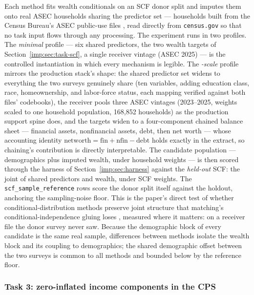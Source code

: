 Each method fits wealth conditionals on an SCF donor split and imputes them
onto real \cps{} ASEC households sharing the predictor set --- households
built from the Census Bureau's ASEC public-use files \citep{census2025}, read
directly from \texttt{census.gov} so that no task input flows through any
\policyengine{} processing. The experiment runs in two profiles. The
\emph{minimal} profile --- six shared predictors, the two wealth targets of
Section~\ref{imp:sec:task-scf}, a single receiver vintage (ASEC 2025) --- is the
controlled instantiation in which every mechanism is legible. The
\emph{\populace{}-scale} profile mirrors the production stack's shape: the
shared predictor set widens to everything the two surveys genuinely share
(ten variables, adding education class, race, homeownership, and labor-force
status, each mapping verified against both files' codebooks), the receiver
pools three ASEC vintages (2023--2025, weights scaled to one household
population, 168,852 households) as the production support spine does, and
the targets widen to a four-component chained balance sheet --- financial
assets, nonfinancial assets, debt, then net worth --- whose accounting
identity $\text{networth} = \text{fin} + \text{nfin} - \text{debt}$ holds
exactly in the extract, so chaining's contribution is directly
interpretable. The candidate population --- \cps{} demographics plus imputed wealth,
under \cps{} household weights --- is then scored through the harness of
Section~\ref{imp:sec:harness} against the \emph{held-out} SCF: the joint of
shared predictors and wealth, under SCF weights. The
\texttt{scf\_sample\_reference} rows score the donor split itself against the
holdout, anchoring the sampling-noise floor. This is the paper's direct test
of whether conditional-distribution methods preserve joint structure that
matching's conditional-independence gluing loses \citep{rassler2002statistical,
dorazio2006statistical}, measured where it matters: on a receiver file the
donor survey never saw. Because the demographic block of every candidate is
the same real \cps{} sample, differences between methods isolate the wealth
block and its coupling to demographics; the shared demographic offset between
the two surveys is common to all methods and bounded below by the reference
floor.

\subsubsection{Task 3: zero-inflated income components in the CPS}
\label{imp:sec:task-cps}

